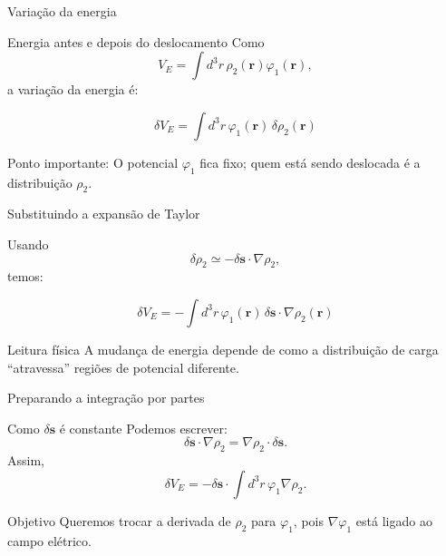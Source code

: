 \documentclass[aspectratio=169,11pt]{beamer}
\begin{document}
\begin{frame}{Variação da energia}

\begin{mybox}{Energia antes e depois do deslocamento}
Como
\[
V_E = \int d^3r\,\rho_2(\mathbf r)\varphi_1(\mathbf r),
\]
a variação da energia é:
\end{mybox}

\begin{eqbox}
\begin{equation}
\delta V_E
=
\int d^3r\,\varphi_1(\mathbf r)\,\delta\rho_2(\mathbf r)
\tag{3.66}
\end{equation}
\end{eqbox}

\begin{alertblock}{Ponto importante: }
O potencial \(\varphi_1\) fica fixo; quem está sendo deslocada é a distribuição \(\rho_2\).
\end{alertblock}

\end{frame}

\begin{frame}{Substituindo a expansão de Taylor}

\begin{mybox}{Usando}
\[
\delta\rho_2
\simeq
-\delta\mathbf{s}\cdot\nabla\rho_2,
\]
temos:
\end{mybox}

\begin{eqbox}
\begin{equation}
\delta V_E
=
-\int d^3r\,
\varphi_1(\mathbf r)
\,
\delta\mathbf{s}\cdot\nabla\rho_2(\mathbf r)
\tag{3.67}
\end{equation}
\end{eqbox}

\begin{alertblock}{Leitura física}
A mudança de energia depende de como a distribuição de carga ``atravessa'' regiões de potencial diferente.
\end{alertblock}

\end{frame}

\begin{frame}{Preparando a integração por partes}

\begin{mybox}{Como \(\delta\mathbf{s}\) é constante}
Podemos escrever:
\[
\delta\mathbf{s}\cdot\nabla\rho_2
=
\nabla\rho_2\cdot\delta\mathbf{s}.
\]
Assim,
\[
\delta V_E
=
-\delta\mathbf{s}\cdot
\int d^3r\,\varphi_1\nabla\rho_2.
\]
\end{mybox}

\begin{alertblock}{Objetivo}
Queremos trocar a derivada de \(\rho_2\) para \(\varphi_1\), pois \(\nabla\varphi_1\) está ligado ao campo elétrico.
\end{alertblock}

\end{frame}
\end{document}
